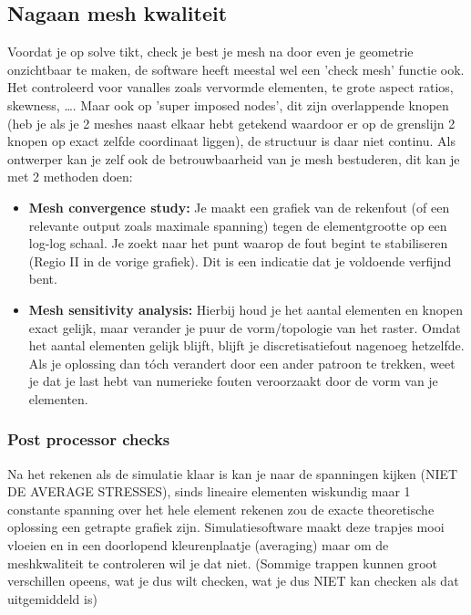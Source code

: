 \documentclass[a4paper,11pt,twoside]{report}
\begin{document}
\subsection{Nagaan mesh kwaliteit}
Voordat je op solve tikt, check je best je mesh na door even je geometrie onzichtbaar te maken, de
software heeft meestal wel een 'check mesh' functie ook. Het controleerd voor vanalles zoals
vervormde elementen, te grote aspect ratios, skewness, \dots. Maar ook op 'super imposed nodes', dit
zijn overlappende knopen (heb je als je 2 meshes naast elkaar hebt getekend waardoor er op de
grenslijn 2 knopen op exact zelfde coordinaat liggen), de structuur is daar niet continu.
\newline
\newline
Als ontwerper kan je zelf ook de betrouwbaarheid van je mesh bestuderen, dit kan je met 2 methoden
doen:
\begin{itemize}
    \item \textbf{Mesh convergence study:} Je maakt een grafiek van de rekenfout (of een relevante
          output zoals maximale spanning) tegen de elementgrootte op een log-log schaal. Je zoekt naar het
          punt waarop de fout begint te stabiliseren (Regio II in de vorige grafiek). Dit is een indicatie
          dat je voldoende verfijnd bent.
    \item \textbf{Mesh sensitivity analysis:} Hierbij houd je het aantal elementen en knopen exact
          gelijk, maar verander je puur de vorm/topologie van het raster. Omdat het aantal elementen
          gelijk blijft, blijft je discretisatiefout nagenoeg hetzelfde. Als je oplossing dan tóch
          verandert door een ander patroon te trekken, weet je dat je last hebt van numerieke fouten
          veroorzaakt door de vorm van je elementen.
\end{itemize}
\subsubsection{Post processor checks}
Na het rekenen als de simulatie klaar is kan je naar de spanningen kijken (NIET DE AVERAGE
STRESSES), sinds lineaire elementen wiskundig maar 1 constante spanning over het hele element
rekenen zou de exacte theoretische oplossing een getrapte grafiek zijn. Simulatiesoftware maakt deze
trapjes mooi vloeien en in een doorlopend kleurenplaatje (averaging) maar om de meshkwaliteit te
controleren wil je dat niet. (Sommige trappen kunnen groot verschillen opeens, wat je dus wilt
checken, wat je dus NIET kan checken als dat uitgemiddeld is)
\end{document}
